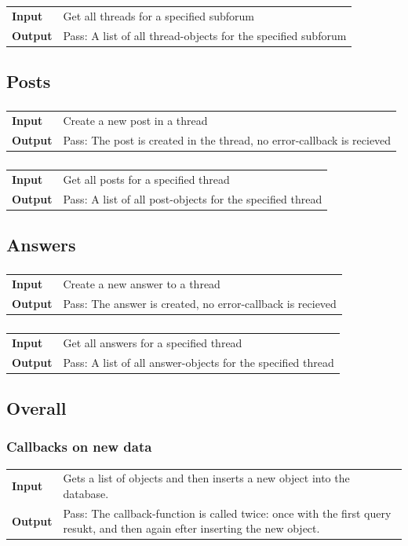 \documentclass[a4paper, 12pt, titlepage]{article}
\newcommand{\testcase}[2]{
	\subsubsection{}
	\begin{tabular}{l p{11cm}}
	\bf{Input} & 
		#1\\
	\bf{Output} & 
		#2\\
	\end{tabular}
}
\newcommand{\ttestcase}[3]{
	\subsubsection{#1}
	\begin{tabular}{l p{11cm}}
	\bf{Input} & 
		#2\\
	\bf{Output} & 
		#3\\
	\end{tabular}
}
\begin{document}
		\testcase
		{
			Get all threads for a specified subforum
		}{
			Pass: A list of all thread-objects for the specified subforum
		}

	\subsection{Posts}

		\testcase
		{
			Create a new post in a thread
		}{
			Pass: The post is created in the thread, no error-callback is recieved
		}

		\testcase
		{
			Get all posts for a specified thread
		}{
			Pass: A list of all post-objects for the specified thread
		}

	\subsection{Answers}

		\testcase
		{
			Create a new answer to a thread
		}{
			Pass: The answer is created, no error-callback is recieved
		}

		\testcase
		{
			Get all answers for a specified thread
		}{
			Pass: A list of all answer-objects for the specified thread
		}


	\subsection{Overall}

		\ttestcase{Callbacks on new data}
		{
			Gets a list of objects and then inserts a new object into the database.
		}{
			Pass: The callback-function is called twice: once with the first query resukt, and then again efter inserting the new object.
		}
\end{document}
